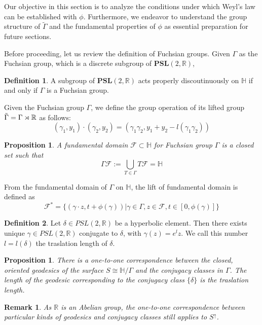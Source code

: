 \documentclass[12pt,a4paper,english]{article}
\theoremstyle{plain}
\newtheorem{prop}[thm]{Proposition}
\newtheorem{rmk}{Remark}
\theoremstyle{definition}
\newtheorem{defi}{Definition}
\theoremstyle{remark}
\begin{document}
Our objective in this section is to analyze the conditions under which Weyl's law can be established with $\phi$. Furthermore, we endeavor to understand the group structure of $\tilde{\Gamma}$ and the fundamental properties of $\phi$ as essential preparation for future sections.


Before proceeding, let us review the definition of Fuchsian groups. Given $\Gamma$ as the Fuchsian group, which is a discrete subgroup of $\textbf{PSL}(2,\mathbb{R})$, 
\begin{defi}
    A subgroup of $\textbf{PSL}(2,\mathbb{R})$ acts properly discoutinuously on $\mathbb{H}$ if and only if $\Gamma$ is a Fuchsian group.
\end{defi}
Given the Fuchsian group $\Gamma$, we define the group operation of its lifted group $\Tilde{\Gamma}=\Gamma\rtimes \mathbb{R}$ as follows:
\begin{equation*}
    (\gamma_{1},y_{1})\cdot(\gamma_{2},y_{2})=(\gamma_{1}\gamma_{2},y_{1}+y_{2}-l(\gamma_{1}\gamma_{2}))
\end{equation*}
\begin{prop}
    A fundamental domain $\mathcal{F}\subset \mathbb{H}$ for Fuchsian group $\Gamma$ is a closed set such that 
    \begin{equation*}
        \Gamma\mathcal{F}:=\bigcup_{T\in\Gamma}T\mathcal{F}=\mathbb{H}
    \end{equation*}
\end{prop}

From the fundamental domain of $\Gamma$ on $\mathbb{H}$, the lift of fundamental domain is defined as 
\begin{equation*}
    \mathcal{F}^{*}=\{(\gamma\cdot z,t+\phi(\gamma))|\gamma\in \Gamma, z\in \mathcal{F}, t\in[0,\phi(\gamma)]\}
\end{equation*}

\begin{defi}
    Let $\delta\in PSL(2, \mathbb{R})$ be a hyperbolic element. Then there exists unique $\gamma \in PSL(2, \mathbb{R})$ conjugate to $\delta$, with $\gamma(z)=e^{l}z$. We call this number $l=l(\delta)$ the traslation length of $\delta$.
\end{defi}
\begin{prop}
    There is a one-to-one correspondence between the closed, oriented geodesics of the surface $S\cong \mathbb{H}/\Gamma$ and the conjugacy classes in $\Gamma$. The length of the geodesic corresponding to the conjugacy class $\{\delta\}$ is the traslation length.
\end{prop}
\begin{rmk}
As $\mathbb{R}$ is an Abelian group, the one-to-one correspondence between particular kinds of geodesics and conjugacy classes still applies to $S^{\uparrow}$.
\end{rmk}
\end{document}
